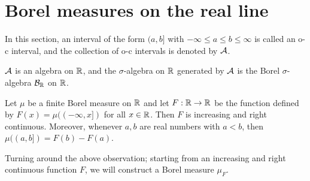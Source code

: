 \section{Borel measures on the real line}

\begin{nota}
    In this section, an interval of the form $(a, b]$ with $-\infty\leq a\leq b\leq\infty$ is called an o-c interval, and the collection of o-c intervals is denoted by ${\mathcal{A}}$.
\end{nota}
\begin{rmk}
    ${\mathcal{A}}$ is an algebra on ${\mathbb{R}}$, and the $\sigma$-algebra on ${\mathbb{R}}$ generated by ${\mathcal{A}}$ is the Borel $\sigma$-algebra ${\mathcal{B}}_{\mathbb{R}}$ on ${\mathbb{R}}$.
\end{rmk}

\begin{obs}
    Let $\mu$ be a finite Borel measure on ${\mathbb{R}}$ and let $F: {\mathbb{R}}\rightarrow{\mathbb{R}}$ be the function defined by $F(x)=\mu((-\infty, x])$ for all $x\in{\mathbb{R}}$.
    Then $F$ is increasing and right continuous.
    Moreover, whenever $a, b$ are real numbers with $a<b$, then $\mu((a, b])=F(b)-F(a)$.
\end{obs}
\begin{sketch}
    Turning around the above observation; starting from an increasing and right continuous function $F$, we will construct a Borel measure $\mu_F$.
\end{sketch}

